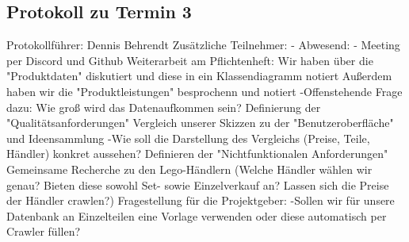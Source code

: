 \subsection{Protokoll zu Termin 3}
Protokollführer: Dennis Behrendt \newline
Zusätzliche Teilnehmer: - \newline
Abwesend: - \newline \newline
Meeting per Discord und Github \newline
Weiterarbeit am Pflichtenheft: \newline
Wir haben über die "Produktdaten" diskutiert und diese in ein Klassendiagramm notiert \newline
Außerdem haben wir die "Produktleistungen" besprochenn und notiert \newline
 -Offenstehende Frage dazu: Wie groß wird das Datenaufkommen sein? \newline
Definierung der "Qualitätsanforderungen" \newline
Vergleich unserer Skizzen zu der "Benutzeroberfläche" und Ideensammlung \newline
 -Wie soll die Darstellung des Vergleichs (Preise, Teile, Händler) konkret aussehen? \newline
Definieren der "Nichtfunktionalen Anforderungen" \newline
Gemeinsame Recherche zu den Lego-Händlern (Welche Händler wählen wir genau? Bieten diese sowohl Set- sowie Einzelverkauf an? Lassen sich die Preise der Händler crawlen?) \newline
Fragestellung für die Projektgeber: \newline
 -Sollen wir für unsere Datenbank an Einzelteilen eine Vorlage verwenden oder diese automatisch per Crawler füllen? \newline
 
